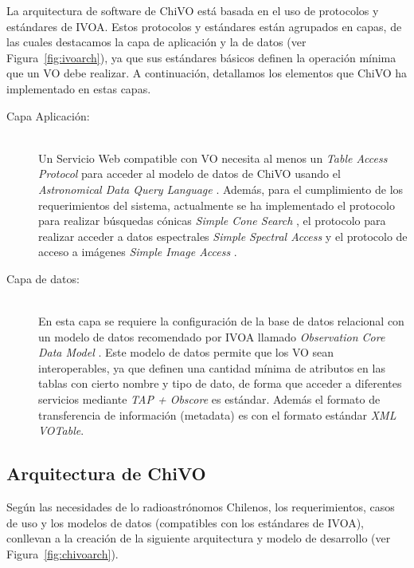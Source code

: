 La arquitectura de software de ChiVO está basada en el uso de protocolos y estándares de
IVOA. Estos protocolos y estándares están agrupados en capas, de las cuales
destacamos la capa de aplicación y la de datos (ver Figura~\ref{fig:ivoarch}),
ya que sus estándares básicos definen la operación mínima que un VO debe
realizar. A continuación, detallamos los elementos que ChiVO ha implementado
en estas capas.

\begin{description}
    \item[Capa Aplicación:] \hfill \\
        Un Servicio Web compatible con VO necesita al menos un \emph{Table Access
        Protocol} \cite{dowler2010table} para acceder al modelo de datos de ChiVO usando el
        \emph{Astronomical Data Query Language} \cite{yasuda2004astronomical}.
        Además, para el cumplimiento de los requerimientos del sistema,
        actualmente se ha implementado
        el protocolo para realizar búsquedas cónicas \emph{Simple Cone Search}
        \cite{williams2008simple}, el protocolo para realizar acceder a datos
        espectrales \emph{Simple Spectral Access} \cite{tody2008simple} y el protocolo de
        acceso a imágenes \emph{Simple Image Access} \cite{tody2004simple}.

    \item[Capa de datos:] \hfill \\
        En esta capa se requiere la configuración de la base de datos relacional con
        un modelo de datos recomendado por IVOA llamado \emph{Observation Core Data
        Model} \cite{louys2011ivoa}. Este modelo de datos permite que los VO sean interoperables,
        ya que definen una cantidad mínima de atributos en las tablas con cierto
        nombre y tipo de dato, de forma que acceder a diferentes servicios mediante
        \emph{TAP + Obscore} es estándar.
        Además el formato de transferencia de información (metadata) es con el
        formato estándar \emph{XML VOTable}.
\end{description}

\subsection{Arquitectura de ChiVO}

Según las necesidades de lo radioastrónomos Chilenos, los requerimientos, casos de
uso y los modelos de datos (compatibles con los estándares de IVOA),
conllevan a la creación de la siguiente arquitectura y modelo de desarrollo (ver
Figura~\ref{fig:chivoarch}).

